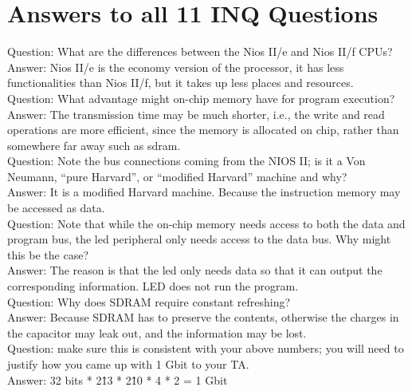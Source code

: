 \documentclass[12pt]{article}
\begin{document}
\section{Answers to all 11 INQ Questions}
Question: What are the differences between the Nios II/e and Nios II/f CPUs? \\

Answer: Nios II/e is the economy version of the processor, it has less functionalities than Nios II/f, but it takes up less places and resources. \\

Question: What advantage might on-chip memory have for program execution? \\

Answer: The transmission time may be much shorter, i.e., the write and read operations are more efficient, since the memory is allocated on chip, rather than somewhere far away such as sdram. \\

Question: Note the bus connections coming from the NIOS II; is it a Von Neumann, “pure Harvard”, or “modified Harvard” machine and why? \\

Answer: It is a modified Harvard machine. Because the instruction memory may be accessed as data. \\

Question: Note that while the on-chip memory needs access to both the data and program bus, the led peripheral only needs access to the data bus. Why might this be the case? \\

Answer: The reason is that the led only needs data so that it can output the corresponding information. LED does not run the program. \\

Question: Why does SDRAM require constant refreshing? \\

Answer: Because SDRAM has to preserve the contents, otherwise the charges in the capacitor may leak out, and the information may be lost. \\

Question: make sure this is consistent with your above numbers; you will need to justify how you came up with 1 Gbit to your TA. \\

Answer: 32 bits * 2\^13 * 2\^10 * 4 * 2 = 1 Gbit \\
\end{document}
